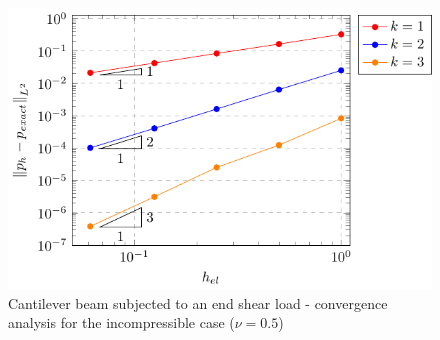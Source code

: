 \documentclass{wccm2024}
\begin{document}
\begin{figure} [!htb]
     \hfill
    \includegraphics[trim={8.5cm 0cm 0cm 0cm},clip,scale=0.75]{figs/bishop-pres-03.pdf}
    \caption{Cantilever beam subjected to an end shear load - convergence analysis for the incompressible case ($\nu=0.5$)}
    \label{fig:bishop-convergence-nu-05}
\end{figure}
\end{document}
